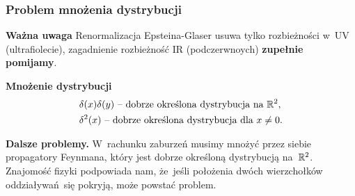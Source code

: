 \documentclass[10pt,t]{beamer}
\begin{document}
\begin{frame}
  \frametitle{Problem mnożenia dystrybucji}


  \textbf{Ważna uwaga}
  Renormalizacja Epsteina-Glaser usuwa tylko rozbieżności w~UV
  (ultrafiolecie), zagadnienie rozbieżność IR (podczerwnoych)
  \textbf{zupełnie pomijamy}.

  \VerSpaceFour





  \textbf{Mnożenie dystrybucji}
  \begin{align}
    \label{eq:Remornalizacja-E-G-01-A}
    &\delta( x ) \delta( y ) \textrm{ -- dobrze określona dystrybucja na }
      \mathbb{R}^{ 2 }, \\
    \label{eq:Remornalizacja-E-G-01-B}
    &\delta^{ 2 }( x ) \textrm{ -- dobrze określona dystrybucja dla }
      x \neq 0.
  \end{align}

  \VerSpaceFour





  \textbf{Dalsze problemy.}
  W~rachunku zaburzeń musimy mnożyć przez siebie propagatory Feynmana,
  który jest dobrze określoną dystrybucją na~$\mathbb{R}^{ 2 }$. Znajomość fizyki
  podpowiada nam, że~jeśli położenia dwóch wierzchołków
  oddziaływań~się pokryją, może powstać problem.

\end{frame}











\end{document}
